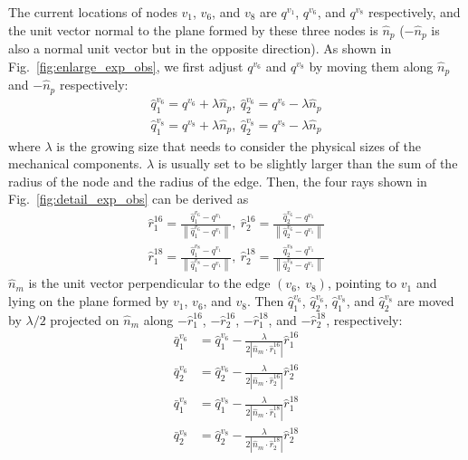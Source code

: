 \documentclass[journal]{IEEEtran}
\begin{document}
The current locations of nodes $v_1$, $v_6$, and $v_8$ are $q^{v_1}$,
$q^{v_6}$, and $q^{v_8}$ respectively, and the unit vector normal to
the plane formed by these three nodes is $\hat{n}_p$ ($-\hat{n}_p$ is
also a normal unit vector but in the opposite direction). As shown in
Fig.~\ref{fig:enlarge_exp_obs}, we first adjust $q^{v_6}$ and
$q^{v_8}$ by moving them along $\hat{n}_p$ and $-\hat{n}_p$
respectively:
\begin{gather*}
    \hat{q}^{v_6}_{1}=q^{v_6}+\lambda\hat{n}_p,\ \hat{q}^{v_6}_{2}=q^{v_6}-\lambda\hat{n}_p\\
    \hat{q}^{v_8}_{1}=q^{v_8}+\lambda\hat{n}_p,\ \hat{q}^{v_8}_{2}=q^{v_8}-\lambda\hat{n}_p
\end{gather*}
where $\lambda$ is the growing size that needs to consider the
physical sizes of the mechanical components. $\lambda$ is usually set
to be slightly larger than the sum of the radius of the node and the
radius of the edge. Then, the four rays shown in
Fig.~\ref{fig:detail_exp_obs} can be derived as
\begin{gather*}
    \hat{r}^{16}_{1}=\frac{\hat{q}^{v_6}_{1}-q^{v_1}}{\left\|\hat{q}^{v_6}_{1}-q^{v_1}\right\|},\ \hat{r}^{16}_{2}=\frac{\hat{q}^{v_6}_{2}-q^{v_1}}{\left\|\hat{q}^{v_6}_{2}-q^{v_1}\right\|}\\
    \hat{r}^{18}_{1}=\frac{\hat{q}^{v_8}_{1}-q^{v_1}}{\left\|\hat{q}^{v_8}_{1}-q^{v_1}\right\|},\ \hat{r}^{18}_{2}=\frac{\hat{q}^{v_8}_{2}-q^{v_1}}{\left\|\hat{q}^{v_8}_{2}-q^{v_1}\right\|}
\end{gather*}
$\hat{n}_m$ is the unit vector perpendicular to the edge
$\left(v_6,\ v_8\right)$, pointing to $v_1$ and lying on the plane
formed by $v_1$, $v_6$, and $v_8$. Then $\hat{q}^{v_6}_{1}$,
$\hat{q}^{v_6}_{2}$, $\hat{q}^{v_8}_{1}$, and $\hat{q}^{v_8}_{2}$ are
moved by $\lambda/2$ projected on $\hat{n}_m$ along
$-\hat{r}^{16}_{1}$, $-\hat{r}^{16}_{2}$, $-\hat{r}^{18}_{1}$, and
$-\hat{r}^{18}_{2}$, respectively:
\begin{align*}
    \bar{q}^{v_6}_{1}&=\hat{q}^{v_6}_{1}-\frac{\lambda}{2\left|\hat{n}_m\cdot\hat{r}^{16}_{1}\right|}\hat{r}^{16}_{1}\\
    \bar{q}^{v_6}_{2}&=\hat{q}^{v_6}_{2}-\frac{\lambda}{2\left|\hat{n}_m\cdot\hat{r}^{16}_{2}\right|}\hat{r}^{16}_{2}\\
    \bar{q}^{v_8}_{1}&=\hat{q}^{v_8}_{1}-\frac{\lambda}{2\left|\hat{n}_m\cdot\hat{r}^{18}_{1}\right|}\hat{r}^{18}_{1}\\
    \bar{q}^{v_8}_{2}&=\hat{q}^{v_8}_{2}-\frac{\lambda}{2\left|\hat{n}_m\cdot\hat{r}^{18}_{2}\right|}\hat{r}^{18}_{2}
\end{align*}
\end{document}
